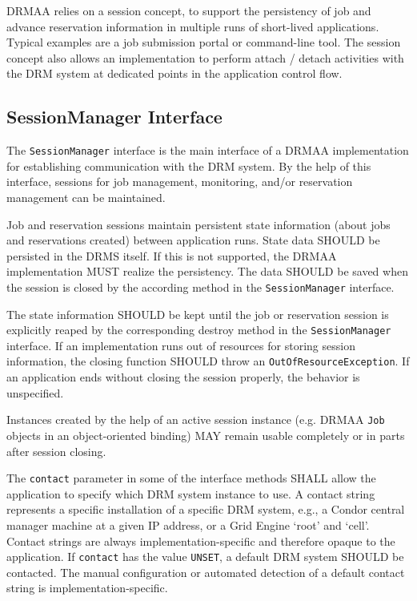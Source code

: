 \documentclass{article}
\newcommand{\h}[1]{\lstinline|#1|}
\begin{document}
DRMAA relies on a session concept, to support the persistency of job and advance reservation information in multiple runs of short-lived applications. Typical examples are a job submission portal or command-line tool. The session concept also allows an implementation to perform attach / detach activities with the DRM system at dedicated points in the application control flow.

\subsection{SessionManager Interface}
\label{sec:sessionmanager}



The \h{SessionManager} interface is the main interface of a DRMAA implementation for establishing communication with the DRM system. By the help of this interface, sessions for job management, monitoring, and/or reservation management can be maintained. 

Job and reservation sessions maintain persistent state information (about jobs and reservations created) between application runs. State data SHOULD be persisted in the DRMS itself. If this is not supported, the DRMAA implementation MUST realize the persistency. The data SHOULD be saved when the session is closed by the according method in the \h{SessionManager} interface. 

The state information SHOULD be kept until the job or reservation session is explicitly reaped by the corresponding destroy method in the \h{SessionManager} interface. If an implementation runs out of resources for storing session information, the closing function SHOULD throw an \h{OutOfResourceException}. If an application ends without closing the session properly, the behavior is unspecified. 

Instances created by the help of an active session instance (e.g. DRMAA \h{Job} objects in an object-oriented binding) MAY remain usable completely or in parts after session closing.

The \h{contact} parameter in some of the interface methods SHALL allow the application to specify which DRM system instance to use. A contact string represents a specific installation of a specific DRM system, e.g., a Condor central manager machine at a given IP address, or a Grid Engine ‘root’ and ‘cell’. Contact strings are always implementation-specific and therefore opaque to the application. If \h{contact} has the value \h{UNSET}, a default DRM system SHOULD be contacted. The manual configuration or automated detection of a default contact string is implementation-specific.
\end{document}
